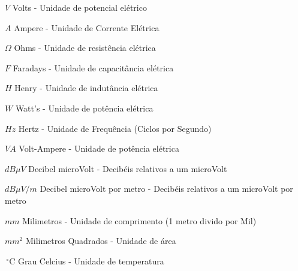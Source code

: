 \documentclass{ifscTCC} %
\begin{document}
\begin{simbolos}
   \item[$V$] Volts - Unidade de potencial elétrico
   \item[$A$] Ampere - Unidade de Corrente Elétrica
   \item[$\Omega$] Ohms - Unidade de resistência elétrica
   \item[$F$] Faradays - Unidade de capacitância elétrica
   \item[$H$] Henry - Unidade de indutância elétrica
   \item[$W$] Watt's - Unidade de potência elétrica
   \item[$Hz$] Hertz - Unidade de Frequência (Ciclos por Segundo)
   \item[$VA$] Volt-Ampere - Unidade de potência elétrica
   \item[$dB\mu V$] Decibel microVolt - Decibéis relativos a um microVolt
   \item[$dB\mu V/m$] Decibel microVolt por metro - Decibéis relativos a um microVolt por metro
   \item[$mm$] Milimetros - Unidade de comprimento (1 metro divido por Mil)
   \item[$mm^{2}$] Milimetros Quadrados - Unidade de área
   \item[$\,^{\circ}\mathrm{C}$] Grau Celcius - Unidade de temperatura
\end{simbolos}

\tableofcontents*
\cleardoublepage

\textual


\end{document}

